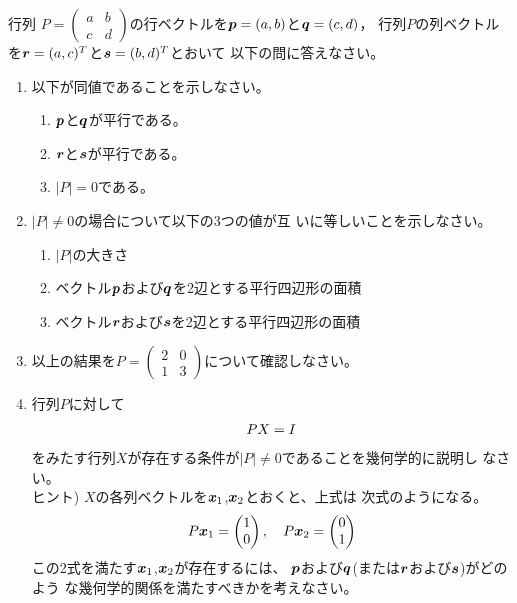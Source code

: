 \documentclass[twocolumn,11pt]{jarticle}
\begin{document}
\nquestion
行列
$P=
  \begin{pmatrix}
    a & b \\
    c & d
  \end{pmatrix}
$の行ベクトルを$\boldsymbol{p}=(a,b)$と$\boldsymbol{q}=(c,d)$，
行列$P$の列ベクトルを$\boldsymbol{r}=(a,c)^T$と$\boldsymbol{s}=(b,d)^T$とおいて
以下の問に答えなさい。
\begin{enumerate}
\item 以下が同値であることを示しなさい。
  \begin{enumerate}
  \item $\boldsymbol{p}$と$\boldsymbol{q}$が平行である。
  \item $\boldsymbol{r}$と$\boldsymbol{s}$が平行である。
  \item $|P|=0$である。
  \end{enumerate}
\item $|P|\ne 0$の場合について以下の3つの値が互
  いに等しいことを示しなさい。
  \begin{enumerate}
  \item $|P|$の大きさ
  \item ベクトル$\boldsymbol{p}$および$\boldsymbol{q}$を2辺とする平行四辺形の面積
  \item ベクトル$\boldsymbol{r}$および$\boldsymbol{s}$を2辺とする平行四辺形の面積
  \end{enumerate}
\item 以上の結果を$P=
  \begin{pmatrix}
    2 & 0 \\
    1 & 3
  \end{pmatrix}
$について確認しなさい。
\item 行列$P$に対して
  \begin{align}
    PX=I\notag
  \end{align}
をみたす行列$X$が存在する条件が$|P|\ne 0$であることを幾何学的に説明し
なさい。\\
ヒント) $X$の各列ベクトルを$\boldsymbol{x}_1$,$\boldsymbol{x}_2$とおくと、上式は
次式のようになる。
  \begin{align}
    P\boldsymbol{x}_1=
    \begin{pmatrix}
      1 \\ 0
    \end{pmatrix},\quad
    P\boldsymbol{x}_2=
    \begin{pmatrix}
      0 \\ 1
    \end{pmatrix}\notag
  \end{align}
この2式を満たす$\boldsymbol{x}_1$,$\boldsymbol{x}_2$が存在するには、
$\boldsymbol{p}$および$\boldsymbol{q}$(または$\boldsymbol{r}$および$\boldsymbol{s}$)がどのよう
な幾何学的関係を満たすべきかを考えなさい。
\end{enumerate}
\end{document}
